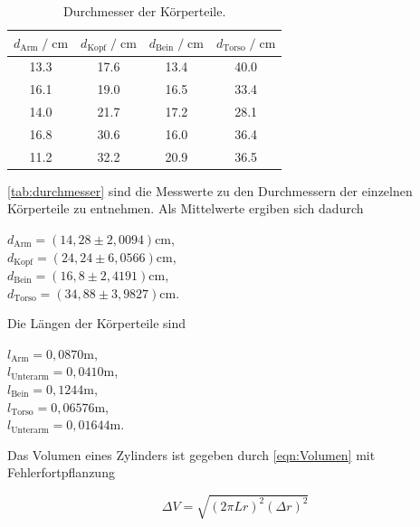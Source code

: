 \begin{table}
  \centering
    \caption{Durchmesser der Körperteile.}
    \label{tab:durchmesser}
    \begin{tabular}{c c c c}
    \toprule
    $d_\text{Arm} \;/\; \si{\centi\meter}$ & $d_\text{Kopf} \;/\; \si{\centi\meter}$ & $d_\text{Bein} \;/\; \si{\centi\meter}$ & $d_\text{Torso} \;/\; \si{\centi\meter}$ \\
    \midrule
    13.3 & 17.6 & 13.4 & 40.0 \\
    16.1 & 19.0 & 16.5 & 33.4 \\
    14.0 & 21.7 & 17.2 & 28.1 \\
    16.8 & 30.6 & 16.0 & 36.4 \\
    11.2 & 32.2 & 20.9 & 36.5 \\
    \bottomrule
  \end{tabular}
\end{table}


\autoref{tab:durchmesser} sind die Messwerte zu den Durchmessern der einzelnen Körperteile zu entnehmen. Als Mittelwerte ergiben sich dadurch
\begin{center}
  $d_{\text{Arm}} = (14,28 \pm 2,0094)\si{\centi\meter}$, \\
  $d_{\text{Kopf}} = (24,24 \pm 6,0566)\si{\centi\meter}$, \\
  $d_{\text{Bein}} = (16,8 \pm 2,4191)\si{\centi\meter}$, \\
  $d_{\text{Torso}} = (34,88 \pm 3,9827)\si{\centi\meter}$. \\ 
\end{center}

Die Längen der Körperteile sind
\begin{center}
  $l_{\text{Arm}} = 0,0870 \si{\meter}$, \\
  $l_{\text{Unterarm}} = 0,0410 \si{\meter}$, \\
  $l_{\text{Bein}} = 0,1244 \si{\meter}$, \\
  $l_{\text{Torso}} = 0,06576 \si{\meter}$, \\
  $l_{\text{Unterarm}} = 0,01644 \si{\meter}$. \\
\end{center}

Das Volumen eines Zylinders ist gegeben durch \autoref{eqn:Volumen} mit Fehlerfortpflanzung

\begin{equation*}
  \Delta V = \sqrt{(2 \pi Lr)^2 (\Delta r)^2}
\end{equation*}


